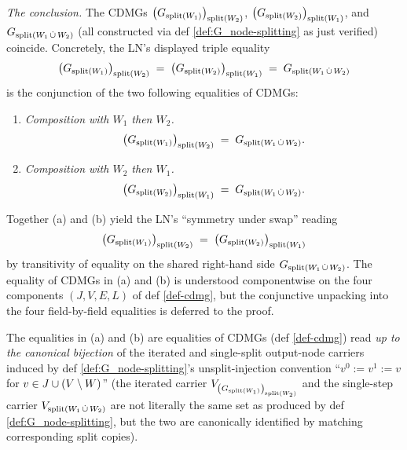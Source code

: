 \documentclass[main]{subfiles}
\begin{document}
\begin{Lem}
    \emph{The conclusion.}
    The CDMGs $\left ( G_{\mathrm{split}(W_1)} \right )_{\mathrm{split}(W_2)}$, $\left ( G_{\mathrm{split}(W_2)} \right )_{\mathrm{split}(W_1)}$, and $G_{\mathrm{split}(W_1 \,\dot{\cup}\, W_2)}$ (all constructed via def \ref{def:G_node-splitting} as just verified) coincide. Concretely, the LN's displayed triple equality
    \[ \left ( G_{\mathrm{split}(W_1)} \right )_{\mathrm{split}(W_2)} \;=\; \left ( G_{\mathrm{split}(W_2)} \right )_{\mathrm{split}(W_1)} \;=\; G_{\mathrm{split}(W_1 \,\dot{\cup}\, W_2)} \]
    is the conjunction of the two following equalities of CDMGs:
    \begin{enumerate}[label=(\alph*)]
        \item \emph{Composition with $W_1$ then $W_2$.}
              \[ \left ( G_{\mathrm{split}(W_1)} \right )_{\mathrm{split}(W_2)} \;=\; G_{\mathrm{split}(W_1 \,\dot{\cup}\, W_2)}. \]
        \item \emph{Composition with $W_2$ then $W_1$.}
              \[ \left ( G_{\mathrm{split}(W_2)} \right )_{\mathrm{split}(W_1)} \;=\; G_{\mathrm{split}(W_1 \,\dot{\cup}\, W_2)}. \]
    \end{enumerate}
    Together (a) and (b) yield the LN's ``symmetry under swap'' reading
    \[ \left ( G_{\mathrm{split}(W_1)} \right )_{\mathrm{split}(W_2)} \;=\; \left ( G_{\mathrm{split}(W_2)} \right )_{\mathrm{split}(W_1)} \]
    by transitivity of equality on the shared right-hand side $G_{\mathrm{split}(W_1 \,\dot{\cup}\, W_2)}$. The equality of CDMGs in (a) and (b) is understood componentwise on the four components $(J, V, E, L)$ of def \ref{def-cdmg}, but the conjunctive unpacking into the four field-by-field equalities is deferred to the proof.

    The equalities in (a) and (b) are equalities of CDMGs (def \ref{def-cdmg}) read \emph{up to the canonical bijection} of the iterated and single-split output-node carriers induced by def \ref{def:G_node-splitting}'s unsplit-injection convention ``$v^0 := v^1 := v$ for $v \in J \cup (V \setminus W)$'' (the iterated carrier $V_{\left ( G_{\mathrm{split}(W_1)} \right )_{\mathrm{split}(W_2)}}$ and the single-step carrier $V_{\mathrm{split}(W_1 \,\dot{\cup}\, W_2)}$ are not literally the same set as produced by def \ref{def:G_node-splitting}, but the two are canonically identified by matching corresponding split copies).
\end{Lem}
\end{document}
